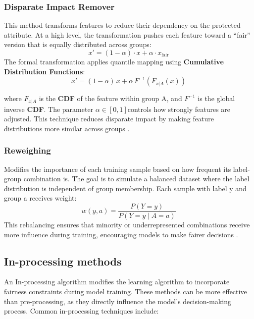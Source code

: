 \documentclass[12pt,a4paper,openright,twoside]{book}
\begin{document}
\subsubsection{Disparate Impact Remover} This method transforms features to reduce their dependency on the protected attribute.
At a high level, the transformation pushes each feature toward a “fair” version that is equally distributed across groups:
\begin{equation}
    x' = (1 - \alpha) \cdot x + \alpha \cdot x_{\text{fair}}
\end{equation}
The formal transformation applies quantile mapping using \textbf{Cumulative Distribution Functions}:
\begin{equation}
    x' = (1 - \alpha)\, x + \alpha\, F^{-1}(F_{x|A}(x))
\end{equation}

where \begin{math} F_{x | A} \end{math} is the \textbf{CDF} of the feature within group A, and \begin{math}F^{-1}\end{math} is the global inverse \textbf{CDF}. The parameter \begin{math} \alpha \in [0, 1] \end{math}controls how strongly features are adjusted.
This technique reduces disparate impact by making feature distributions more similar across groups \cite{feldman2015certifyingremovingdisparateimpact}.

\subsubsection{Reweighing} Modifies the importance of each training sample based on how frequent its label-group combination is. The goal is to simulate a balanced dataset where the label distribution is independent of group membership.
Each sample with label y and group a receives weight:
\begin{equation}
    w(y, a) = \frac{P(Y = y)}{P(Y = y \mid A = a)}
\end{equation}
This rebalancing ensures that minority or underrepresented combinations receive more influence during training, encouraging models to make fairer decisions \cite{8907b030dc7644cabfab035645f9b9da}.


\subsection{In-processing methods} 
An In-processing algorithm modifies the learning algorithm to incorporate fairness constraints during model training. These methods can be more effective than pre-processing, as they directly influence the model's decision-making process. Common in-processing techniques include:
\end{document}
